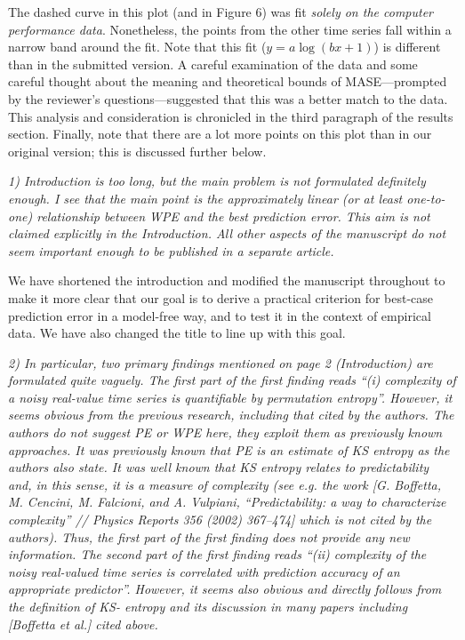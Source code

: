 \documentclass[12pt]{article}
\begin{document}
\noindent The dashed curve in this plot (and in Figure 6) was fit
\emph{solely on the computer performance data}.  Nonetheless, the
points from the other time series fall within a narrow band around the
fit.  Note that this fit ($y = a \log(b x + 1)$) is different than in
the submitted version.  A careful examination of the data and some
careful thought about the meaning and theoretical bounds of
MASE---prompted by the reviewer's questions---suggested that this was
a better match to the data.  This analysis and consideration is
chronicled in the third paragraph of the results section.  Finally,
note that there are a lot more points on this plot than in our
original version; this is discussed further below.

\smallskip

\emph{1) Introduction is too long, but the main problem is not
  formulated definitely enough. I see that the main point is the
  approximately linear (or at least one-to-one) relationship between
  WPE and the best prediction error. This aim is not claimed
  explicitly in the Introduction. All other aspects of the manuscript
  do not seem important enough to be published in a separate article.}

We have shortened the introduction and modified the manuscript
throughout to make it more clear that our goal is to derive a
practical criterion for best-case prediction error in a model-free
way, and to test it in the context of empirical data.  We have also
changed the title to line up with this goal.

\smallskip

\emph{2) In particular, two primary findings mentioned on page 2
  (Introduction) are formulated quite vaguely. The first part of the
  first finding reads ``(i) complexity of a noisy real-value time
  series is quantifiable by permutation entropy''. However, it seems
  obvious from the previous research, including that cited by the
  authors. The authors do not suggest PE or WPE here, they exploit
  them as previously known approaches. It was previously known that PE
  is an estimate of KS entropy as the authors also state. It was well
  known that KS entropy relates to predictability and, in this sense,
  it is a measure of complexity (see e.g. the work [G. Boffetta,
    M. Cencini, M. Falcioni, and A.  Vulpiani, ``Predictability: a way
    to characterize complexity'' // Physics Reports 356 (2002)
    367–474] which is not cited by the authors). Thus, the first part
  of the first finding does not provide any new information. The
  second part of the first finding reads ``(ii) complexity of the
  noisy real-valued time series is correlated with prediction accuracy
  of an appropriate predictor''.  However, it seems also obvious and
  directly follows from the definition of KS- entropy and its
  discussion in many papers including [Boffetta et al.] cited above.}
\end{document}
